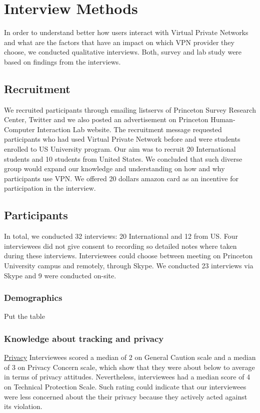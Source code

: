 \section{Interview Methods}\label{Method}
In order to understand better how users interact with Virtual Private Networks and what are the factors that have an impact on which VPN provider they choose, we conducted qualitative interviews. Both, survey and lab study were based on findings from the interviews.
\subsection{Recruitment}
We recruited participants through emailing listservs of Princeton Survey Research Center, Twitter and we also posted an advertisement on Princeton Human-Computer Interaction Lab website. The recruitment message requested participants who had used Virtual Private Network before and were students enrolled to US University program. Our aim was to recruit 20 International students and 10 students from United States. We concluded that such diverse group would expand our knowledge and understanding on how and why participants use VPN. We offered 20 dollars amazon card as an incentive for participation in the interview.
\subsection{Participants}
In total, we conducted 32 interviews: 20 International and 12 from US. Four interviewees did not give consent to recording so detailed notes where taken during these interviews. Interviewees could choose between meeting on Princeton University campus and remotely, through Skype. We conducted 23 interviews via Skype and 9 were conducted on-site. 

\subsubsection{Demographics} Put the table

\subsubsection{Knowledge about tracking and privacy}
\label{sec:methods-tracking}

\underline{Privacy}
Interviewees scored a median of 2 on General Caution scale and a median of 3 on Privacy Concern scale, which show that they were about below to average in terms of privacy attitudes. Nevertheless, interviewees had a median score of 4 on Technical Protection Scale. Such rating could indicate that our interviewees were less concerned  about the their privacy because they actively acted against its violation. 

